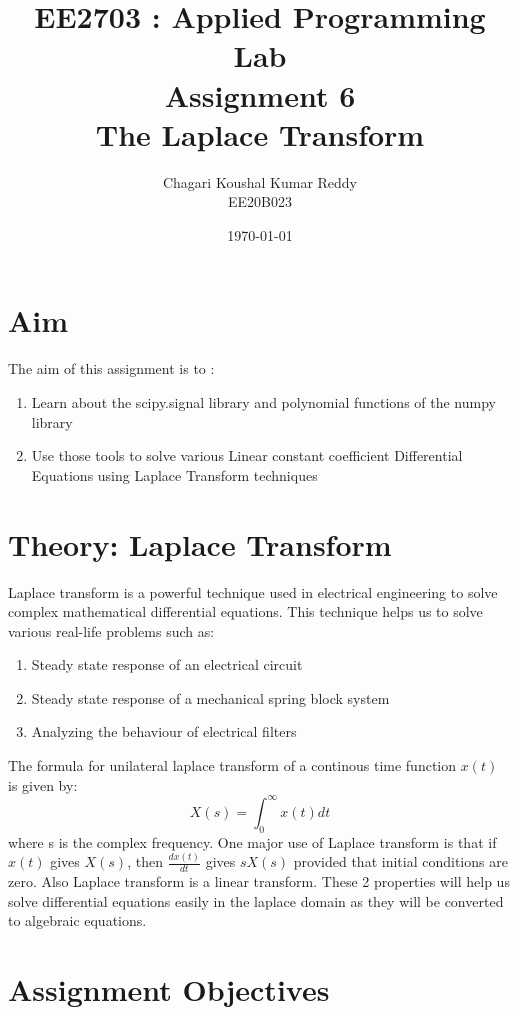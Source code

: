 \documentclass[12pt, a4paper]{article}
\title{\textbf{EE2703 : Applied Programming Lab \\ Assignment 6 \\ The Laplace Transform}}
\author{Chagari Koushal Kumar Reddy \\ EE20B023} %
\date{\today} %
\begin{document}
		

\maketitle %
\clearpage

\tableofcontents
\clearpage

\section{Aim}
The aim of this assignment is to :
\vspace{-0.3cm}
\begin{enumerate}
    \item Learn about the scipy.signal library and polynomial functions of the numpy
    library
    \item Use those tools to solve various Linear constant coefficient Differential Equations using Laplace Transform techniques
\end{enumerate}
\section{Theory: Laplace Transform}
Laplace transform is a powerful technique used in electrical engineering to solve complex
mathematical differential equations. This technique helps us to solve various
real-life problems such as:
\vspace{-0.3cm}
\begin{enumerate}
    \item Steady state response of an electrical circuit
    \item Steady state response of a mechanical spring block system
    \item Analyzing the behaviour of electrical filters
\end{enumerate}
The formula for unilateral laplace transform of a continous time function $x(t)$ is given by:
\begin{equation*}
    X(s) = \int_{0}^{\infty} x(t)dt
\end{equation*}
where s is the complex frequency. One major use of Laplace transform is that if $x(t)$ gives $X(s)$, then $\frac{dx(t)}{dt}$ gives $sX(s)$ provided that initial conditions are zero.
Also Laplace transform is a linear transform. These 2 properties will help us solve differential equations easily in the laplace domain as they will be converted to algebraic equations.
\section{Assignment Objectives}
\vspace*{-0.5cm}
\end{document}
